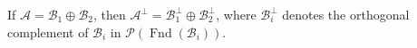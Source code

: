 If $\mathcal{A} = \mathcal{B}_1 \oplus \mathcal{B}_2$, then $\mathcal{A}^{\perp} = \mathcal{B}_1^{\perp} \oplus \mathcal{B}_2^{\perp}$, where $\mathcal{B}_i^{\perp}$ denotes the orthogonal complement of $\mathcal{B}_i$ in $\mathcal{P}(\operatorname{Fnd}(\mathcal{B}_i))$.
